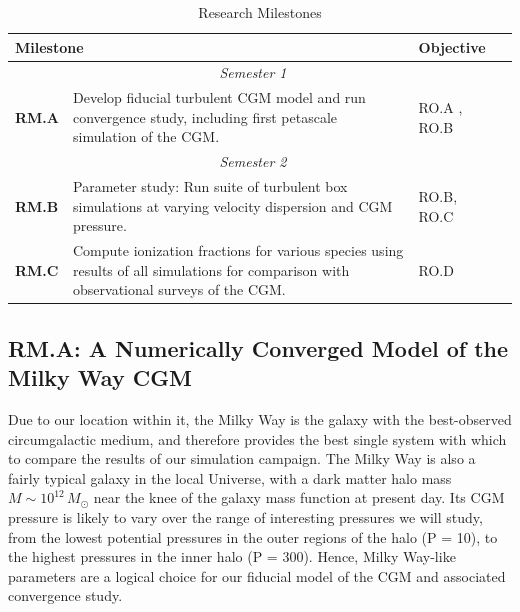 \documentclass[11pt,letterpaper,english]{article}
\begin{document}
\begin{table}[h]
\caption{Research Milestones}
\label{table:RM}
\begin{tabular}{|l|p{4.7in}|p{0.9in}|l|} 
\hline
\multicolumn{2}{|l|}{\bf Milestone} & {\bf Objective} \\ \hline
\multicolumn{3}{|c|}{\it Semester 1} \\ \hline
\textbf{RM.A} & Develop fiducial turbulent CGM model and run convergence study, including first petascale simulation of the CGM. & RO.A , RO.B \\ \hline
\multicolumn{3}{|c|}{\it Semester 2} \\ \hline
\textbf{RM.B} & Parameter study: Run suite of turbulent box simulations at varying velocity dispersion and CGM pressure. & RO.B, RO.C\\ \hline
\textbf{RM.C} & Compute ionization fractions for various species using results of all simulations for comparison with observational surveys of the CGM. & RO.D \\ \hline
\end{tabular}
\end{table}

\vspace{-.25in}
\subsection{RM.A: A Numerically Converged Model of the Milky Way CGM}
\vspace{-.2in}

Due to our location within it, the Milky Way is the galaxy with the best-observed circumgalactic medium, and therefore provides the best single system with which to compare the results of our simulation campaign. The Milky Way is also a fairly typical galaxy in the local Universe, with a dark matter halo mass $M \sim 10^{12}\,M_\odot$ near the knee of the galaxy mass function at present day. Its CGM pressure is likely to vary over the range of interesting pressures we will study, from the lowest potential pressures in the outer regions of the halo (P = 10), to the highest pressures in the inner halo (P = 300). Hence, Milky Way-like parameters are a logical choice for our fiducial model of the CGM and associated convergence study.
\end{document}
